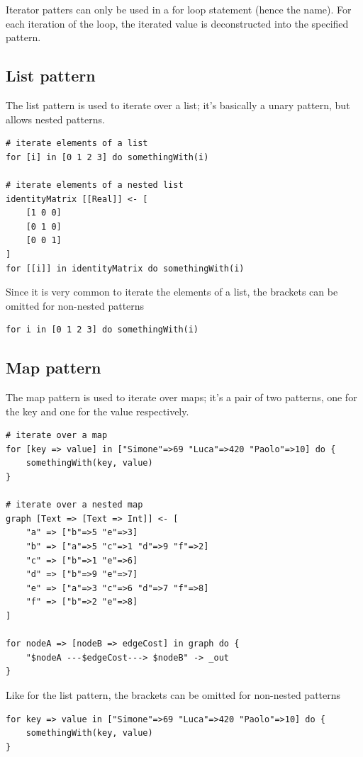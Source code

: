 Iterator patters can only be used in a for loop statement (hence the name). For
each iteration of the loop, the iterated value is deconstructed into the
specified pattern.

\subsection{List pattern}

The list pattern is used to iterate over a list; it's basically a unary
pattern, but allows nested patterns.

\begin{verbatim}
# iterate elements of a list
for [i] in [0 1 2 3] do somethingWith(i)

# iterate elements of a nested list
identityMatrix [[Real]] <- [
	[1 0 0]
	[0 1 0]
	[0 0 1]
]
for [[i]] in identityMatrix do somethingWith(i)
\end{verbatim}

Since it is very common to iterate the elements of a list, the brackets can be
omitted for non-nested patterns

\begin{verbatim}
for i in [0 1 2 3] do somethingWith(i)
\end{verbatim}

\subsection{Map pattern}

The map pattern is used to iterate over maps; it's a pair of two patterns, one
for the key and one for the value respectively.

\begin{verbatim}
# iterate over a map
for [key => value] in ["Simone"=>69 "Luca"=>420 "Paolo"=>10] do {
	somethingWith(key, value)
}

# iterate over a nested map
graph [Text => [Text => Int]] <- [
	"a" => ["b"=>5 "e"=>3]
	"b" => ["a"=>5 "c"=>1 "d"=>9 "f"=>2]
	"c" => ["b"=>1 "e"=>6]
	"d" => ["b"=>9 "e"=>7]
	"e" => ["a"=>3 "c"=>6 "d"=>7 "f"=>8]
	"f" => ["b"=>2 "e"=>8]
]

for nodeA => [nodeB => edgeCost] in graph do {
	"$nodeA ---$edgeCost---> $nodeB" -> _out
}
\end{verbatim}

Like for the list pattern, the brackets can be omitted for non-nested patterns

\begin{verbatim}
for key => value in ["Simone"=>69 "Luca"=>420 "Paolo"=>10] do {
	somethingWith(key, value)
}
\end{verbatim}

